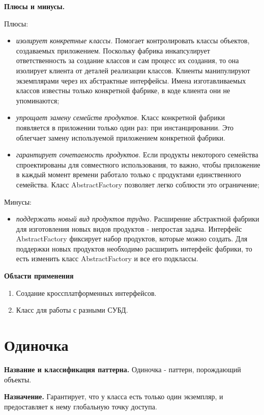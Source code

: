 \documentclass[PI,LAB]{HSEUniversity}
\begin{document}
\textbf{Плюсы и минусы.}

Плюсы:
\begin{itemize}
  \item \textit{изолирует конкретные классы.} Помогает контролировать классы объектов, создаваемых приложением. Поскольку фабрика инкапсулирует ответственность за создание классов и сам процесс их создания, то она изолирует клиента от деталей реализации классов. Клиенты манипулируют экземплярами через их абстрактные интерфейсы. Имена изготавливаемых классов известны только конкретной фабрике, в коде клиента они не упоминаются;
  \item \textit{упрощает замену семейств продуктов.} Класс конкретной фабрики появляется в приложении только один раз: при инстанцировании. Это облегчает замену используемой приложением конкретной фабрики. 
  \item \textit{гарантирует сочетаемость продуктов.} Если продукты некоторого семейства  спроектированы для совместного использования, то важно, чтобы приложение в каждый момент времени работало только с продуктами единственного семейства. Класс AbstractFactory позволяет легко соблюсти это ограничение;
\end{itemize}
Минусы:
\begin{itemize}
  \item \textit{поддержать новый вид продуктов трудно.} Расширение абстрактной фабрики для изготовления новых видов продуктов - непростая задача. Интерфейс AbstractFactory фиксирует набор продуктов, которые можно создать. Для поддержки новых продуктов необходимо расширить интерфейс фабрики, то есть изменить класс AbstractFactory и все его подклассы.
\end{itemize}

\textbf{Области применения}

\begin{enumerate}
  \item Создание кроссплатформенных интерфейсов.
  \item Класс для работы с разными СУБД.
\end{enumerate}

\chapter{Одиночка}
\textbf{Название и классификация паттерна.}
Одиночка - паттерн, порождающий объекты.

\textbf{Назначение.}
Гарантирует, что у класса есть только один экземпляр, и предоставляет к нему глобальную точку доступа.
\end{document}
